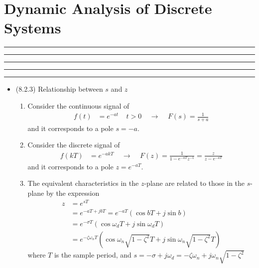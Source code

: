 
\setcounter{chapter}{7}
\setcounter{section}{1}
\section{Dynamic Analysis of Discrete Systems}
\vspace{-8pt} \hrule \hrule \hrule \hrule \hrule  \vspace{12pt}
\begin{itemize}
\item (8.2.3) Relationship between $s$ and $z$ 
\begin{enumerate}
		\item Consider the continuous signal of 
		\begin{align*}
			f(t) &= e^{-at} ~~~~~ t >0  ~~~~~ \rightarrow ~~~~~  F(s) = \frac{1}{s+a}
		\end{align*}
		and it corresponds to a pole $s=-a$. 
		\item Consider the discrete signal of 
		\begin{align*}
			f(kT) &= e^{-akT}  ~~~~~ \rightarrow ~~~~~  F(z) =  \frac{1}{1-e^{-aT}z^{-1}} = \frac{z}{z-e^{-aT}}
		\end{align*}
		and it corresponds to a pole $z=e^{-aT}$. 
		\item The equivalent characteristics in the $z$-plane are related to those in the $s$-plane by the expression
		\begin{align*}
			z &= e^{sT}\\
			&= e^{-aT +jbT} = e^{-aT} (\cos bT + j \sin b) \\
			&= e^{-\sigma T} (\cos \omega_d T + j \sin \omega_d T ) \\
			&= e^{-\zeta \omega_n T} (\cos \omega_n \sqrt{1-\zeta^2} T + j \sin \omega_n \sqrt{1-\zeta^2} T )
		\end{align*}
		where $T$ is the sample period, and $s = -\sigma  + j \omega_d = -\zeta \omega_n + j \omega_n \sqrt{1-\zeta^2} $
	\end{enumerate}
\end{itemize}

